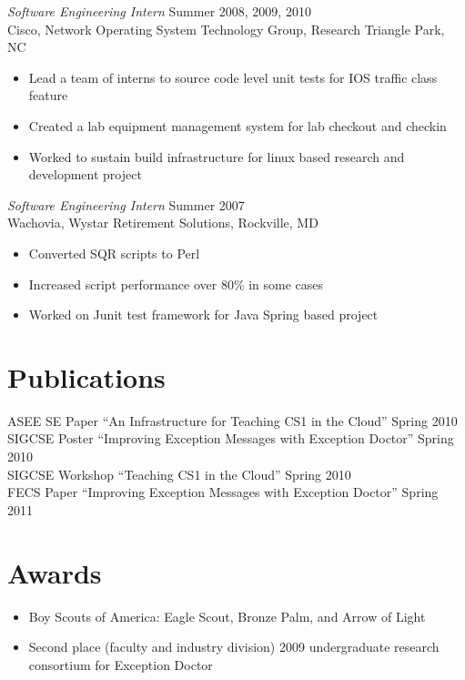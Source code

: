 \documentclass[line,margin]{res}
\begin{document}
\begin{resume}
        {\sl Software Engineering Intern} \hfill  Summer 2008, 2009, 2010 \\
           Cisco, Network Operating System Technology Group, Research Triangle Park, NC
              \begin{itemize}  \itemsep -2pt %
                   \item Lead a team of interns to source code level unit
                     tests for IOS traffic class feature
                   \item Created a lab equipment management system for lab checkout and checkin
                   \item Worked to sustain build infrastructure for linux
                     based research and development project
              \end{itemize}
        {\sl Software Engineering Intern} \hfill  Summer 2007 \\
           Wachovia, Wystar Retirement Solutions, Rockville, MD
              \begin{itemize}  \itemsep -2pt %
                   \item Converted SQR scripts to Perl
                   \item Increased script performance over 80\% in some cases
                   \item Worked on Junit test framework for Java Spring based project
              \end{itemize} 

\section{Publications}
ASEE SE Paper ``An Infrastructure for Teaching CS1 in the Cloud'' Spring 2010 \\
SIGCSE Poster ``Improving Exception Messages with Exception Doctor'' Spring 2010 \\
SIGCSE Workshop ``Teaching CS1 in the Cloud'' Spring 2010 \\
FECS Paper ``Improving Exception Messages with Exception Doctor'' Spring 2011

\section{Awards}
\begin{itemize}  \itemsep -2pt %
\item Boy Scouts of America: Eagle Scout, Bronze Palm, and Arrow of Light
\item Second place (faculty and industry division) 2009 undergraduate research consortium for Exception Doctor
\end{itemize}
\end{resume}
\end{document}
